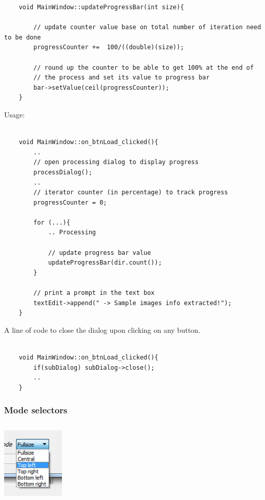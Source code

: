 \documentclass[english]{article}
\begin{document}
{\begin{lstlisting}
	void MainWindow::updateProgressBar(int size){
		
		// update counter value base on total number of iteration need to be done
		progressCounter +=  100/((double)(size));
		
		// round up the counter to be able to get 100% at the end of
		// the process and set its value to progress bar
		bar->setValue(ceil(progressCounter));
	}
\end{lstlisting}


Usage: 

\begin{lstlisting}

	void MainWindow::on_btnLoad_clicked(){
		..
		// open processing dialog to display progress
		processDialog();
		..
		// iterator counter (in percentage) to track progress
		progressCounter = 0;
		
		for (...){
			.. Processing
			
			// update progress bar value
			updateProgressBar(dir.count());
		}
		
		// print a prompt in the text box
		textEdit->append(" -> Sample images info extracted!");	
	}

\end{lstlisting}



A line of code to close the dialog upon clicking on any button.

\begin{lstlisting}

	void MainWindow::on_btnLoad_clicked(){
		if(subDialog) subDialog->close();
		..
	}

\end{lstlisting}



\subsubsection{Mode selectors}

\begin{center}
	\includegraphics[width=3cm,height=4cm]{img/mode.jpg}	
\end{center} 

}
\end{document}
